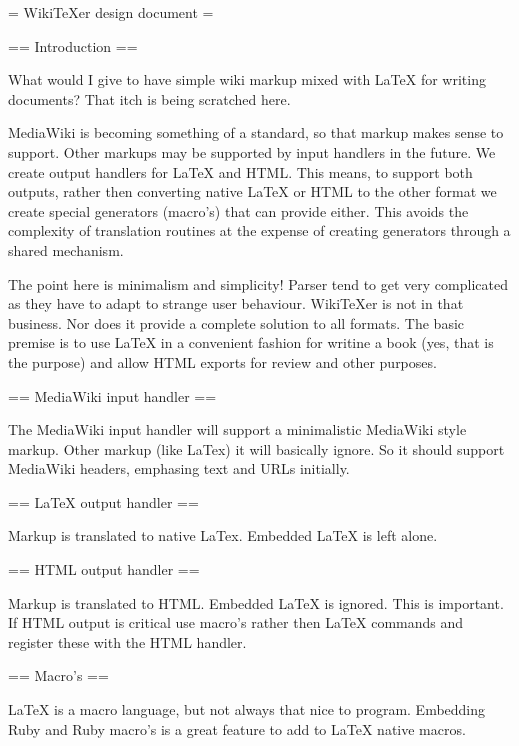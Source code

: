 = WikiTeXer design document =

== Introduction ==

What would I give to have simple wiki markup mixed with LaTeX for
writing documents? That itch is being scratched here.

MediaWiki is becoming something of a standard, so that markup makes
sense to support. Other markups may be supported by input handlers in
the future. We create output handlers for LaTeX and HTML. This means,
to support both outputs, rather then converting native LaTeX or HTML
to the other format we create special generators (macro's) that can
provide either. This avoids the complexity of translation routines at the
expense of creating generators through a shared mechanism.

The point here is minimalism and simplicity! Parser tend to get very 
complicated as they have to adapt to strange user behaviour. WikiTeXer
is not in that business. Nor does it provide a complete solution to
all formats. The basic premise is to use LaTeX in a convenient fashion
for writine a book (yes, that is the purpose) and allow HTML exports
for review and other purposes.


== MediaWiki input handler ==

The MediaWiki input handler will support a minimalistic MediaWiki style 
markup. Other markup (like LaTex) it will basically ignore. So it should
support MediaWiki headers, emphasing text and URLs initially.


== LaTeX output handler ==

Markup is translated to native LaTex. Embedded LaTeX is left alone.


== HTML output handler ==

Markup is translated to HTML. Embedded LaTeX is ignored. This is
important. If HTML output is critical use macro's rather then LaTeX
commands and register these with the HTML handler.


== Macro's ==

LaTeX is a macro language, but not always that nice to program.
Embedding Ruby and Ruby macro's is a great feature to add to LaTeX
native macros.
